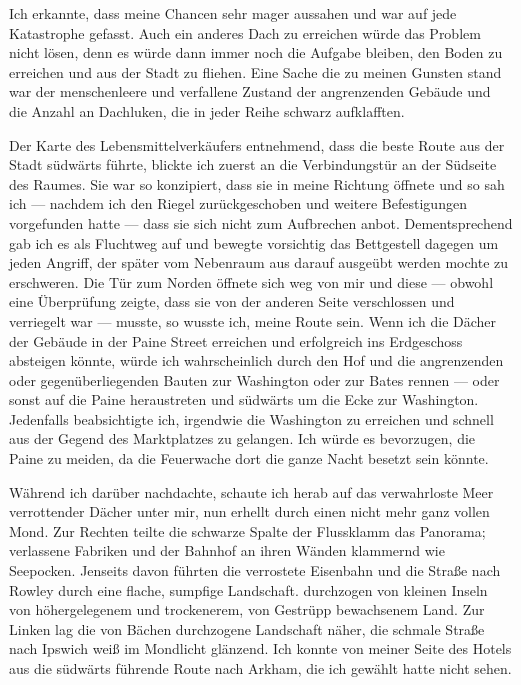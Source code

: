 Ich erkannte, dass meine Chancen sehr mager aussahen und war auf jede Katastrophe gefasst. Auch ein anderes Dach zu erreichen würde das Problem nicht lösen, denn es würde dann immer noch die Aufgabe bleiben, den Boden zu erreichen und aus der Stadt zu fliehen. Eine Sache die zu meinen Gunsten stand war der menschenleere und verfallene Zustand der angrenzenden Gebäude und die Anzahl an Dachluken, die in jeder Reihe schwarz aufklafften.

Der Karte des Lebensmittelverkäufers entnehmend, dass die beste Route aus der Stadt südwärts führte, blickte ich zuerst an die Verbindungstür an der Südseite des Raumes. Sie war so konzipiert, dass sie in meine Richtung öffnete und so sah ich --- nachdem ich den Riegel zurückgeschoben und weitere Befestigungen vorgefunden hatte --- dass sie sich nicht zum Aufbrechen anbot. Dementsprechend gab ich es als Fluchtweg auf und bewegte vorsichtig das Bettgestell dagegen um jeden Angriff, der später vom Nebenraum aus darauf ausgeübt werden mochte zu erschweren. Die Tür zum Norden öffnete sich weg von mir und diese --- obwohl eine Überprüfung zeigte, dass sie von der anderen Seite verschlossen und verriegelt war --- musste, so wusste ich, meine Route sein. Wenn ich die Dächer der Gebäude in der Paine Street erreichen und erfolgreich ins Erdgeschoss absteigen könnte, würde ich wahrscheinlich durch den Hof und die angrenzenden oder gegenüberliegenden Bauten zur Washington oder zur Bates rennen --- oder sonst auf die Paine heraustreten und südwärts um die Ecke zur Washington. Jedenfalls beabsichtigte ich, irgendwie die Washington zu erreichen und schnell aus der Gegend des Marktplatzes zu gelangen. Ich würde es bevorzugen, die Paine zu meiden, da die Feuerwache dort die ganze Nacht besetzt sein könnte.

Während ich darüber nachdachte, schaute ich herab auf das verwahrloste Meer verrottender Dächer unter mir, nun erhellt durch einen nicht mehr ganz vollen Mond. Zur Rechten teilte die schwarze Spalte der Flussklamm das Panorama; verlassene Fabriken und der Bahnhof an ihren Wänden klammernd wie Seepocken. Jenseits davon führten die verrostete Eisenbahn und die Straße nach Rowley durch eine flache, sumpfige Landschaft. durchzogen von kleinen Inseln von höhergelegenem und trockenerem, von Gestrüpp bewachsenem Land. Zur Linken lag die von Bächen durchzogene Landschaft näher, die schmale Straße nach Ipswich weiß im Mondlicht glänzend. Ich konnte von meiner Seite des Hotels aus die südwärts führende Route nach Arkham, die ich gewählt hatte nicht sehen.

